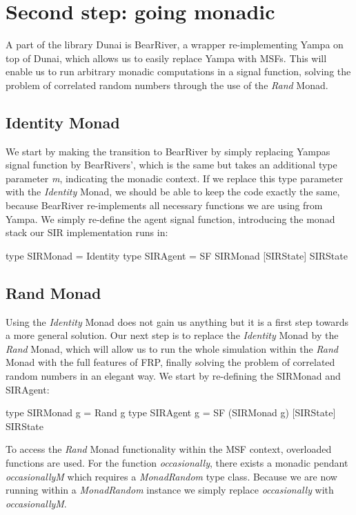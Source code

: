 \section{Second step: going monadic}
\label{sec:timedriven_monadic}

A part of the library Dunai is BearRiver, a wrapper re-implementing Yampa on top of Dunai, which allows us to easily replace Yampa with MSFs. This will enable us to run arbitrary monadic computations in a signal function, solving the problem of correlated random numbers through the use of the \textit{Rand} Monad.

\subsection{Identity Monad}
We start by making the transition to BearRiver by simply replacing Yampas signal function by BearRivers', which is the same but takes an additional type parameter \textit{m}, indicating the monadic context. If we replace this type parameter with the \textit{Identity} Monad, we should be able to keep the code exactly the same, because BearRiver re-implements all necessary functions we are using from Yampa. We simply re-define the agent signal function, introducing the monad stack our SIR implementation runs in:

\begin{HaskellCode}
type SIRMonad = Identity
type SIRAgent = SF SIRMonad [SIRState] SIRState
\end{HaskellCode}

\subsection{Rand Monad}
Using the \textit{Identity} Monad does not gain us anything but it is a first step towards a more general solution. Our next step is to replace the \textit{Identity} Monad by the \textit{Rand} Monad, which will allow us to run the whole simulation within the \textit{Rand} Monad with the full features of FRP, finally solving the problem of correlated random numbers in an elegant way. We start by re-defining the SIRMonad and SIRAgent:

\begin{HaskellCode}
type SIRMonad g = Rand g
type SIRAgent g = SF (SIRMonad g) [SIRState] SIRState
\end{HaskellCode}

To access the \textit{Rand} Monad functionality within the MSF context, overloaded functions are used. For the function \textit{occasionally}, there exists a monadic pendant \textit{occasionallyM} which requires a \textit{MonadRandom} type class. Because we are now running within a \textit{MonadRandom} instance we simply replace \textit{occasionally} with \textit{occasionallyM}. 

